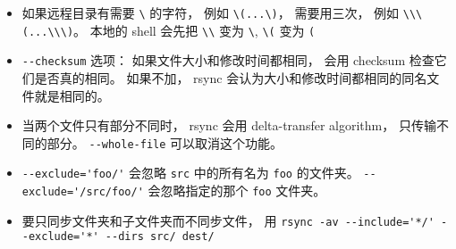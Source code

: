 \begin{itemize}
\item 如果远程目录有需要 \verb`\` 的字符， 例如 \verb`\(...\)`， 需要用三次， 例如 \verb`\\\(...\\\)`。 本地的 shell 会先把 \verb`\\` 变为 \verb`\`, \verb`\(` 变为 \verb`(`
\item \verb`--checksum` 选项： 如果文件大小和修改时间都相同， 会用 checksum 检查它们是否真的相同。 如果不加， rsync 会认为大小和修改时间都相同的同名文件就是相同的。
\item 当两个文件只有部分不同时， rsync 会用 delta-transfer algorithm， 只传输不同的部分。 \verb`--whole-file` 可以取消这个功能。
\item \verb`--exclude='foo/'` 会忽略 \verb`src` 中的所有名为 \verb`foo` 的文件夹。 \verb`--exclude='/src/foo/'` 会忽略指定的那个 \verb`foo` 文件夹。
\item 要只同步文件夹和子文件夹而不同步文件， 用 \verb`rsync -av --include='*/' --exclude='*' --dirs src/ dest/`
\end{itemize}

